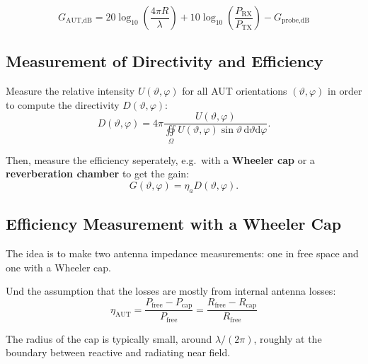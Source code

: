 \begin{equation*}
  G_{\text{AUT,dB}} = 20\log_{10}\left(\dfrac{4\pi R}{\lambda}\right) + 10\log_{10}\left(\dfrac{P_{\text{RX}}}{P_{\text{TX}}}\right) - G_{\text{probe,dB}}
\end{equation*}

\subsection{Measurement of Directivity and Efficiency}
Measure the relative intensity $U(\vartheta, \varphi)$ for all AUT orientations $(\vartheta, \varphi)$ in order to compute the directivity $D(\vartheta, \varphi)$:
\begin{equation}
  D(\vartheta, \varphi) = 4\pi \dfrac{U(\vartheta,\varphi)}{\oiint\limits_{\Omega}U(\vartheta, \varphi) \sin\vartheta\,\mathrm{d}\vartheta\mathrm{d}\varphi}.
\end{equation}

Then, measure the efficiency seperately, e.g.\ with a \textbf{Wheeler cap} or a \textbf{reverberation chamber} to get the gain:
\begin{equation*}
  G(\vartheta, \varphi) = \eta_{a} D(\vartheta, \varphi).
\end{equation*}

\subsection{Efficiency Measurement with a Wheeler Cap}
The idea is to make two antenna impedance measurements: one in free space and one with a Wheeler cap.

Und the assumption that the losses are mostly from internal antenna losses:
\begin{equation}
  \eta_{\text{AUT}} = \dfrac{P_{\text{free}} - P_{\text{cap}}}{P_{\text{free}}} = \dfrac{R_{\text{free}} - R_{\text{cap}}}{R_{\text{free}}}
\end{equation}

The radius of the cap is typically small, around $\lambda / (2\pi)$, roughly at the boundary between reactive and radiating near field.
